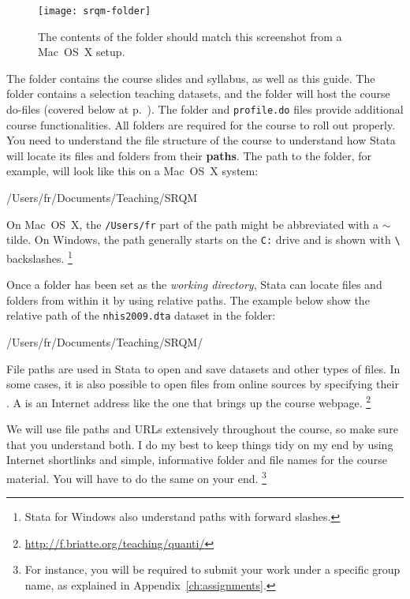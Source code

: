 		\begin{figure}%
		  \texttt{[image: srqm-folder]}
		  \caption{The contents of the \SRQM folder should match %
			this screenshot from a Mac~OS~X setup.}
		  \label{fig:srqm-folder}
		\end{figure}
		
	The \course folder contains the course slides and syllabus, as well as this guide. The \data folder contains a selection teaching datasets, and the \code folder will host the course do-files (covered below at p.~\pageref{sec:do-files}). The \setup folder and \texttt{profile.do} files provide additional course functionalities. All folders are required for the course to roll out properly.%
	You need to understand the file structure of the course to understand how Stata will locate its files and folders from their \textbf{paths}. The path to the \SRQM folder, for example, will look like this on a Mac~OS~X system:\\[1em]%
	
	\begin{docspec}
		/Users/fr/Documents/Teaching/SRQM
	\end{docspec}
	
	On Mac~OS~X, the \texttt{/Users/fr} part of the path might be abbreviated with a \texttt{$\sim$} tilde. On Windows, the path generally starts on the \texttt{C:} drive and is shown with \texttt{\textbackslash} backslashes.%
		\footnote{Stata for Windows also understand paths with forward slashes.}%
	
	Once a folder has been set as the \emph{working directory}, Stata can locate files and folders from within it by using relative paths. The example below show the relative path of the \texttt{nhis2009.dta} dataset in the \texttt{\data} folder:\\[1em]%
	
	\begin{docspec}
		/Users/fr/Documents/Teaching/SRQM/
	\end{docspec}

	File paths are used in Stata to open and save datasets and other types of files. In some cases, it is also possible to open files from online sources by specifying their \URL. A \URL is an Internet address like the one that brings up the course webpage.%
		\footnote{\url{http://f.briatte.org/teaching/quanti/}}%
	
	We will use file paths and URLs extensively throughout the course, so make sure that you understand both. I do my best to keep things tidy on my end by using Internet shortlinks and simple, informative folder and file names for the course material. You will have to do the same on your end.%
		\footnote{For instance, you will be required to submit your work under a specific group name, as explained in Appendix~\ref{ch:assignments}.}%


